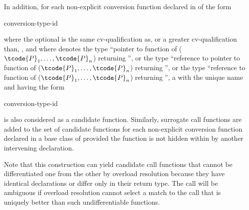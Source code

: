 \pnum
In addition, for each non-explicit conversion function declared in  of the
form
\begin{ncsimplebnf}
 conversion-type-id \terminal{(\,)}     \terminal{;}
\end{ncsimplebnf}
where the optional
is the same cv-qualification as, or a greater cv-qualification than,
\cv{},
and where
denotes the type ``pointer to function
of ($\tcode{P}_1, \dotsc, \tcode{P}_n$) returning '',
or the type ``reference to pointer to function
of ($\tcode{P}_1, \dotsc, \tcode{P}_n$) returning '',
or the type
``reference to function of ($\tcode{P}_1, \dotsc, \tcode{P}_n$)
returning '', a  with the unique name
and having the form
\begin{ncbnf}
  \terminal{(} conversion-type-id \ %
 
\end{ncbnf}
is also considered as a candidate function.
Similarly, surrogate
call functions are added to the set of candidate functions for
each non-explicit conversion function declared in a base class of
provided the function is not hidden within
by another
intervening declaration.
\begin{footnote}
Note that this construction can yield
candidate call functions that cannot be
differentiated one from the other by overload resolution because they have
identical
declarations or differ only in their return type.
The call will be ambiguous
if overload
resolution cannot select a match to the call that is uniquely better than such
undifferentiable functions.
\end{footnote}

